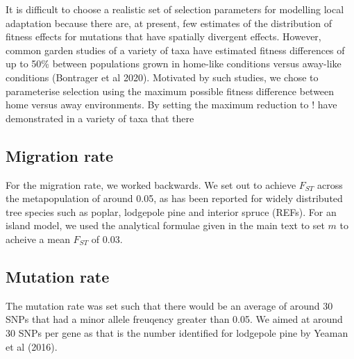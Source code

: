 \documentclass[11pt,twoside,lineno]{GSA_format}
\begin{document}
It is difficult to choose a realistic set of selection parameters for modelling local adaptation because there are, at present, few estimates of the distribution of fitness effects for mutations that have spatially divergent effects. However, common garden studies of a variety of taxa have estimated fitness differences of up to 50\% between populations grown in home-like conditions versus away-like conditions (Bontrager et al 2020). Motivated by such studies, we chose to parameterise selection using the maximum possible fitness difference between home versus away environments. By setting the maximum reduction to $!$
have demonstrated in a variety of taxa that there 

\subsection{Migration rate} 

For the migration rate, we worked backwards. We set out to achieve $F_{ST}$ across the metapopulation of around 0.05, as has been reported for widely distributed tree species such as poplar, lodgepole pine and interior spruce (REFs). For an island model, we used the analytical formulae given in the main text to set $m$ to acheive a mean $F_{ST}$ of 0.03.

\subsection{Mutation rate} 

The mutation rate was set such that there would be an average of around 30 SNPs that had  a minor allele freuqency greater than 0.05. We aimed at around 30 SNPs per gene as that is the number identified for lodgepole pine by Yeaman et al (2016).
\pagebreak
\end{document}
